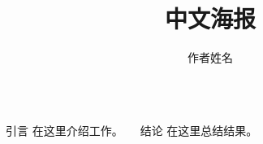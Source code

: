 \documentclass{beamer}
\title{中文海报}
\author{作者姓名}
\begin{document}
\begin{frame}
\begin{columns}[t]
  \begin{block}{引言}
    在这里介绍工作。
  \end{block}
  \begin{block}{结论}
    在这里总结结果。
  \end{block}
\end{columns}
\end{frame}
\end{document}
